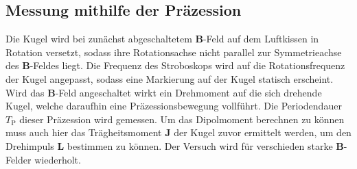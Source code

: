 \subsection{Messung mithilfe der Präzession}
Die Kugel wird bei zunächst abgeschaltetem $\symbf{B}$-Feld auf dem Luftkissen in Rotation versetzt, sodass ihre Rotationsachse nicht parallel zur Symmetrieachse des $\symbf{B}$-Feldes liegt.
Die Frequenz des Stroboskops wird auf die Rotationsfrequenz der Kugel angepasst, sodass eine Markierung auf der Kugel statisch erscheint.
Wird das $\symbf{B}$-Feld angeschaltet wirkt ein Drehmoment auf die sich drehende Kugel, welche daraufhin eine Präzessionsbewegung vollführt.
Die Periodendauer $T_\text{P}$ dieser Präzession wird gemessen.
Um das Dipolmoment berechnen zu können muss auch hier das Trägheitsmoment $\symbf{J}$ der Kugel zuvor ermittelt werden,
um den Drehimpuls $\symbf{L}$ bestimmen zu können.
Der Versuch wird für verschieden starke $\symbf{B}$-Felder wiederholt.

